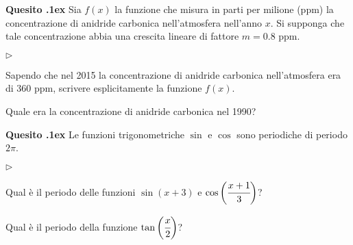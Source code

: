 \documentclass[11pt,twoside,a4paper]{article}
\newcommand{\mylabel}[1]{#1\hfill}
\renewenvironment{itemize}
  {\begin{list}{$\triangleright$}{%
   \setlength{\parskip}{0mm}
   \setlength{\topsep}{.4\baselineskip}
   \setlength{\rightmargin}{0mm}
   \setlength{\listparindent}{0mm}
   \setlength{\itemindent}{0mm}
   \setlength{\labelwidth}{2ex}
   \setlength{\itemsep}{.4\baselineskip}
   \setlength{\parsep}{0mm}
   \setlength{\partopsep}{0mm}
   \setlength{\labelsep}{1ex}
   \setlength{\leftmargin}{\labelwidth+\labelsep}
   \let\makelabel\mylabel}}{%
   \end{list}\vspace*{-1.3mm}}
\newcounter{quesito}
\newenvironment{question}{\bigskip\addtocounter{quesito}{1}\bigskip\bigskip\par\textbf{Quesito \thequesito.\kern1ex}}{\vspace{\parskip}}
\begin{document}
\begin{question}
Sia $f(x)$ la funzione che misura in parti per milione (ppm) la concentrazione di anidride carbonica nell'atmosfera nell'anno $x$. Si supponga che tale concentrazione abbia una crescita lineare di fattore $m = 0.8$ ppm.
\begin{itemize}
\item[1.] Sapendo che nel 2015 la concentrazione di anidride carbonica nell'atmosfera era di 360 ppm, scrivere esplicitamente la funzione $f(x)$.
\item[2.] Quale era la concentrazione di anidride carbonica nel 1990?
\end{itemize}
\end{question}

\begin{question}
Le funzioni trigonometriche $\sin$ e $\cos$ sono periodiche di periodo $2 \pi$.
\begin{itemize}
\item[1.] Qual \`e il periodo delle funzioni $\sin \left( x+3 \right)$ e $\cos \bigg( \cfrac{x+1}{3} \bigg)$?
\item[2.] Qual \`e il periodo della funzione $\tan \bigg( \cfrac{x}{2} \bigg)$?
\end{itemize}
\end{question}
\end{document}
